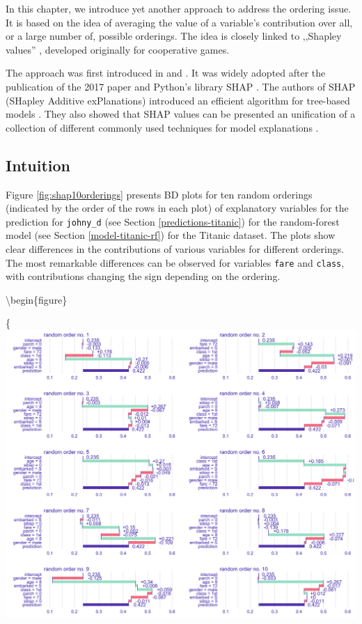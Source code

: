 \documentclass[12pt,]{krantz}
\begin{document}
In this chapter, we introduce yet another approach to address the ordering issue. It is based on the idea of averaging the value of a variable's contribution over all, or a large number of, possible orderings. The idea is closely linked to ,,Shapley values'' \citep{shapleybook1952}, developed originally for cooperative games.

The approach was first introduced in \citep{imeJLMR} and \citep{Strumbelj2014}. It was widely adopted after the publication of the 2017 paper \citep{SHAP} and Python's library SHAP \citep{shapPackage}. The authors of SHAP (SHapley Additive exPlanations) introduced an efficient algorithm for tree-based models \citep{TreeSHAP}. They also showed that SHAP values can be presented an unification of a collection of different commonly used techniques for model explanations \citep{SHAP}.

\hypertarget{SHAPIntuition}{%
\subsection{Intuition}\label{SHAPIntuition}}

Figure \ref{fig:shap10orderings} presents BD plots for ten random orderings (indicated by the order of the rows in each plot) of explanatory variables for the prediction for \texttt{johny\_d} (see Section \ref{predictions-titanic}) for the random-forest model (see Section \ref{model-titanic-rf}) for the Titanic dataset. The plots show clear differences in the contributions of various variables for different orderings. The most remarkable differences can be observed for variables \texttt{fare} and \texttt{class}, with contributions changing the sign depending on the ordering.

\textbackslash{}begin\{figure\}

\{\centering \includegraphics[width=1\linewidth]{figure/shap_10_replicates}
\end{document}
